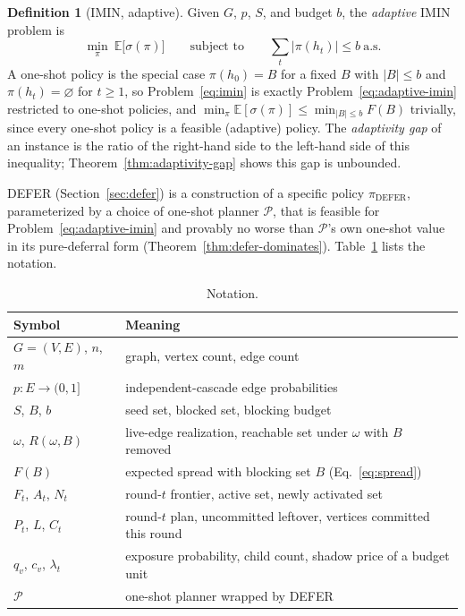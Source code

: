 \documentclass[preprint,11pt]{elsarticle}
\theoremstyle{definition}
\newtheorem{definition}{Definition}
\theoremstyle{remark}
\newcommand{\up}{\rule{0pt}{2.6ex}}
\newcommand{\down}{\rule[-1.2ex]{0pt}{0pt}}
\newcommand{\Rspread}{R}
\newcommand{\FF}{F}
\begin{document}
\begin{definition}[IMIN, adaptive]\label{def:adaptive-imin}
Given $G$, $p$, $S$, and budget $b$, the \emph{adaptive} IMIN problem is
\begin{equation}\label{eq:adaptive-imin}
\min_{\pi}\ \mathbb E\bigl[\sigma(\pi)\bigr]
\qquad\text{subject to}\qquad
\textstyle\sum_t|\pi(h_t)|\le b\ \text{a.s.}
\end{equation}
A one-shot policy is the special case $\pi(h_0)=B$ for a fixed
$B$ with $|B|\le b$ and $\pi(h_t)=\varnothing$ for $t\ge1$, so
Problem~\eqref{eq:imin} is exactly Problem~\eqref{eq:adaptive-imin}
restricted to one-shot policies, and
$\min_\pi\mathbb E[\sigma(\pi)]\le\min_{|B|\le b}\FF(B)$ trivially, since
every one-shot policy is a feasible (adaptive) policy. The
\emph{adaptivity gap} of an instance is the ratio of the right-hand side to
the left-hand side of this inequality; Theorem~\ref{thm:adaptivity-gap}
shows this gap is unbounded.
\end{definition}

DEFER (Section~\ref{sec:defer}) is a construction of a specific policy $\pi_{\mathrm{DEFER}}$, parameterized by a choice of one-shot planner $\mathcal P$, that is feasible for Problem~\eqref{eq:adaptive-imin} and provably no worse than $\mathcal P$'s own one-shot value in its pure-deferral form (Theorem~\ref{thm:defer-dominates}). Table~\ref{tab:notation} lists the notation.

\begin{table}[h]
\centering
\caption{Notation.}\label{tab:notation}
\small
\begin{tabular}{@{}ll@{}}
\hline
\up Symbol & Meaning \\
\hline
\up $G=(V,E)$, $n$, $m$ & graph, vertex count, edge count \\
$p:E\to(0,1]$ & independent-cascade edge probabilities \\
$S$, $B$, $b$ & seed set, blocked set, blocking budget \\
$\omega$, $\Rspread(\omega,B)$ & live-edge realization, reachable set under $\omega$ with $B$ removed \\
$\FF(B)$ & expected spread with blocking set $B$ (Eq.~\ref{eq:spread}) \\
$F_t$, $A_t$, $N_t$ & round-$t$ frontier, active set, newly activated set \\
$P_t$, $L$, $C_t$ & round-$t$ plan, uncommitted leftover, vertices committed this round \\
$q_v$, $c_v$, $\lambda_t$ & exposure probability, child count, shadow price of a budget unit \\
\down $\mathcal P$ & one-shot planner wrapped by DEFER \\
\hline
\end{tabular}
\end{table}
\end{document}
